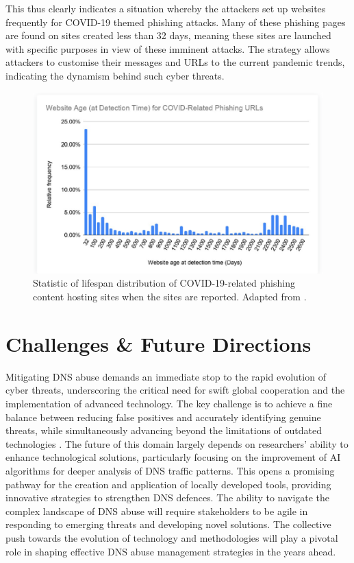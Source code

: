 This thus clearly indicates a situation whereby the attackers set up websites frequently for COVID-19 themed phishing attacks. Many of these phishing pages are found on sites created less than 32 days, meaning these sites are launched with specific purposes in view of these imminent attacks. The strategy allows attackers to customise their messages and URLs to the current pandemic trends, indicating the dynamism behind such cyber threats.

\captionsetup{font= footnotesize}
\begin{figure}[H]
    \centering
    \includegraphics[width=0.8\linewidth]{background/AgeCovid.png}
    \caption{Statistic of lifespan distribution of COVID-19-related phishing content hosting sites when the sites are reported. Adapted from \cite{Unit42AtricleCovidPhishing2021}.}
    \label{fig:figSixteen}
\end{figure}


\section{Challenges \& Future Directions}

Mitigating DNS abuse demands an immediate stop to the rapid evolution of cyber threats, underscoring the critical need for swift global cooperation and the implementation of advanced technology. The key challenge is to achieve a fine balance between reducing false positives and accurately identifying genuine threats, while simultaneously advancing beyond the limitations of outdated technologies \cite{pour2023comprehensive}. The future of this domain largely depends on researchers' ability to enhance technological solutions, particularly focusing on the improvement of AI algorithms for deeper analysis of DNS traffic patterns. This opens a promising pathway for the creation and application of locally developed tools, providing innovative strategies to strengthen DNS defences. The ability to navigate the complex landscape of DNS abuse will require stakeholders to be agile in responding to emerging threats and developing novel solutions. The collective push towards the evolution of technology and methodologies will play a pivotal role in shaping effective DNS abuse management strategies in the years ahead.


